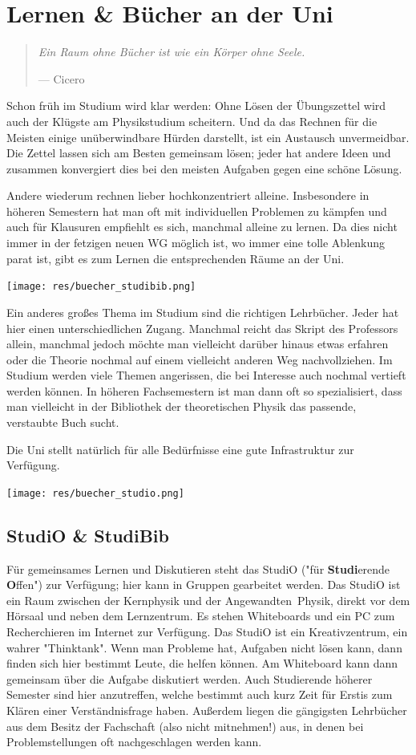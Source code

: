 \section{Lernen \& Bücher an der Uni}
\begin{multicols*}{2}
\begin{quote}
	\textit{Ein Raum ohne Bücher ist wie ein Körper ohne Seele.}
	
	\hfill--- Cicero
\end{quote}
Schon früh im Studium wird klar werden: Ohne Lösen der Übungszettel wird auch der Klügste am Physikstudium scheitern.
Und da das Rechnen für die Meisten einige unüberwindbare Hürden darstellt, ist ein Austausch unvermeidbar.
Die Zettel lassen sich am Besten gemeinsam lösen; jeder hat andere Ideen und zusammen konvergiert dies bei den meisten Aufgaben gegen eine schöne Lösung.

Andere wiederum rechnen lieber hochkonzentriert alleine.
Insbesondere in höheren Semestern hat man oft mit individuellen Problemen zu kämpfen und auch für Klausuren empfiehlt es sich, manchmal alleine zu lernen.
Da dies nicht immer in der fetzigen neuen WG möglich ist, wo immer eine tolle Ablenkung parat ist, gibt es zum Lernen die entsprechenden Räume an der Uni.

\texttt{[image: res/buecher\_studibib.png]}

Ein anderes großes Thema im Studium sind die richtigen Lehrbücher.
Jeder hat hier einen unterschiedlichen Zugang.
Manchmal reicht das Skript des Professors allein, manchmal jedoch möchte man vielleicht darüber hinaus etwas erfahren oder die Theorie nochmal auf einem vielleicht anderen Weg nachvollziehen.
Im Studium werden viele Themen angerissen, die bei Interesse auch nochmal vertieft werden können.
In höheren Fachsemestern ist man dann oft so spezialisiert, dass man vielleicht in der Bibliothek der theoretischen Physik das passende, verstaubte Buch sucht.

Die Uni stellt natürlich für alle Bedürfnisse eine gute Infrastruktur zur Verfügung.

\texttt{[image: res/buecher\_studio.png]}

\subsection{StudiO \& StudiBib}
Für gemeinsames Lernen und Diskutieren steht das StudiO ("für \textbf{Studi}erende \textbf{O}ffen") zur Verfügung; hier kann in Gruppen gearbeitet werden.
Das StudiO ist ein Raum zwischen der Kernphysik und der Angewandten~Physik, direkt vor dem Hörsaal und neben dem Lernzentrum.
Es stehen Whiteboards und ein PC zum Recherchieren im Internet zur Verfügung.
Das StudiO ist ein Kreativzentrum, ein wahrer "Thinktank".
Wenn man Probleme hat, Aufgaben nicht lösen kann, dann finden sich hier bestimmt Leute, die helfen können.
Am Whiteboard kann dann gemeinsam über die Aufgabe diskutiert werden.
Auch Studierende höherer Semester sind hier anzutreffen, welche bestimmt auch kurz Zeit für Erstis zum Klären einer Verständnisfrage haben.
Außerdem liegen die gängigsten Lehrbücher aus dem Besitz der Fachschaft (also nicht mitnehmen!) aus, in denen bei Problemstellungen oft nachgeschlagen werden kann.


\end{multicols*}
